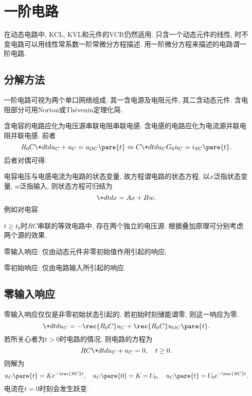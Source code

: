 \documentclass{ctexart}
\begin{document}
\section{一阶电路} %
\label{sec:一阶电路}

在动态电路中, KCL, KVL和元件的VCR仍然适用. 只含一个动态元件的线性, 时不变电路可以用线性常系数一阶常微分方程描述. 用一阶微分方程来描述的电路谓一阶电路.

\subsection{分解方法} %
\label{sub:分解方法}

一阶电路可视为两个单口网络组成. 其一含电源及电阻元件, 其二含动态元件. 含电阻部分可用Norton或Th\'evenin定理化简.
\par
含电容的电路应化为电压源串联电阻串联电感. 含电感的电路应化为电流源并联电阻并联电感. 前者
\[ R_0 C \+dtd{u_C} + u_C = u_{OC}\pare{t}\Leftrightarrow C\+dtd{u_C}G_0 u_C = i_{SC}\pare{t}. \]
后者对偶可得.
\par
电容电压与电感电流为电路的状态变量, 故方程谓电路的状态方程. 以$x$泛指状态变量, $w$泛指输入, 则状态方程可归结为
\[ \+dtdx = Ax + Bw. \]
例如对电容.
\par
$t\ge t_0$时$RC$串联的等效电路中, 存在两个独立的电压源. 根据叠加原理可分别考虑两个源的效果.
\begin{cenum}
    \item 零输入响应: 仅由动态元件非零初始值作用引起的响应;
    \item 零初始响应: 仅由电路输入所引起的响应.
\end{cenum}


\subsection{零输入响应} %
\label{sub:零输入响应}

零输入响应仅仅是非零初始状态引起的. 若初始时刻储能谓零, 则这一响应为零.
\[ \+dtd{u_C} = -\rec{R_0 C}u_C + \rec{R_0 C}u_{OC}\pare{t}. \]
若所关心者为$t>0$时电路的情况, 则电路的方程为
\[ RC\+dtd{u_C} + u_C = 0,\quad t\ge 0. \]
则解为
\[ u_C\pare{t} = Ke^{-\rec{RC}t},\quad u_C\pare{0} = K = U_0,\quad u_C\pare{t} = U_0e^{-\rec{RC}t}. \]
电流在$t=0$时刻会发生跃变.


\end{document}
